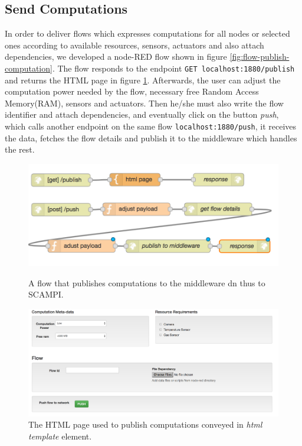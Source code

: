 \subsection{Send Computations}\label{subsec:send-comp}
In order to deliver flows which expresses computations for all nodes or selected ones according to available resources,  sensors, actuators and also attach dependencies, we developed a node-RED flow shown in figure \ref{fig:flow-publish-computation}. The flow responds to the endpoint \verb|GET localhost:1880/publish| and returns the HTML page in figure \ref{fig:html-publish}. Afterwards, the user can adjust the computation power needed by the flow, necessary free Random Access Memory(RAM), sensors and actuators. Then he/she must also write the flow identifier and attach dependencies, and eventually click on the button \textit{push}, which calls another endpoint on the same flow \verb|localhost:1880/push|, it receives the data, fetches the flow details and publish it to the middleware which handles the rest.
 \begin{figure}[H]
	\centering
	\includegraphics[scale=0.6]{images/flow-publish-computation.png}
	\caption{A flow that publishes computations to the middleware dn thus to SCAMPI.}
	\label{fig:flow-publish-computation}
	\centering
	\includegraphics[scale=0.4]{images/html-publish.png}
	\caption{The HTML page used to publish computations conveyed in \textit{html template} element.}
	\label{fig:html-publish}
\end{figure}


